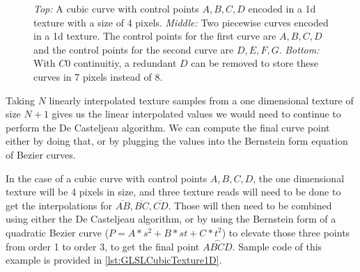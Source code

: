 \documentclass{jcgt}
\begin{document}
  \begin{figure}

    \vspace{5mm}


    \vspace{5mm}

    \caption{\textit{Top:} A cubic curve with control points $A,B,C,D$ encoded in a 1d texture with a size of 4 pixels.  \textit{Middle:} Two piecewise curves encoded in a 1d texture.  The control points for the first curve are $A,B,C,D$ and the control points for the second curve are $D,E,F,G$.  \textit{Bottom:} With $C0$ continuitiy, a redundant $D$ can be removed to store these curves in 7 pixels instead of 8. }    
    \label{fig:texlayeout1d}
  \end{figure}

Taking $N$ linearly interpolated texture samples from a one dimensional texture of size $N+1$ gives us the linear interpolated values we would need to continue to perform the De Casteljeau algorithm.  We can compute the final curve point either by doing that, or by plugging the values into the Bernstein form equation of Bezier curves.

In the case of a cubic curve with control points $A,B,C,D$, the one dimensional texture will be 4 pixels in size, and three texture reads will need to be done to get the interpolations for $\overline{AB},\overline{BC},\overline{CD}$.  Those will then need to be combined using either the De Casteljeau algorithm, or by using the Bernstein form of a quadratic Bezier curve ($P = A*s^2 + B*st + C*t^2$) to elevate those three points from order 1 to order 3, to get the final point $\stackrel{\frown}{ABCD}$.  Sample code of this example is provided in \autoref{lst:GLSLCubicTexture1D}.
\end{document}
